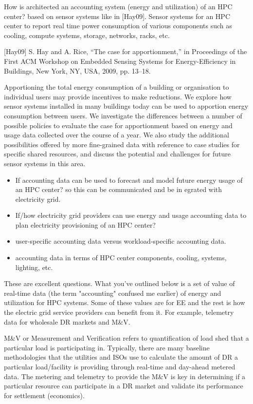 \documentclass{llncs}
\begin{document}
How is architected an accounting system (energy and utilization) of an HPC
center? based on sensor systems like in [Hay09]. Sensor systems for an HPC
center to report real time power consumption of various components such as
cooling, compute systems, storage, networks, racks, etc.

[Hay09] S. Hay and A. Rice, ``The case for apportionment,'' in Proceedings
of the First ACM Workshop on Embedded Sensing Systems for Energy-Efficiency
in Buildings, New York, NY, USA, 2009, pp. 13--18.

Apportioning the total energy consumption of a building or organisation to
individual users may provide incentives to make reductions. We explore how
sensor systems installed in many buildings today can be used to apportion
energy consumption between users. We investigate the differences between a
number of possible policies to evaluate the case for apportionment based on
energy and usage data collected over the course of a year. We also study the
additional possibilities offered by more fine-grained data with reference to
case studies for specific shared resources, and discuss the potential and
challenges for future sensor systems in this area.

\begin{itemize}
\item If accounting data can be used to forecast and model future energy usage of an HPC center? so this can be communicated and be in
egrated with electricity grid.
\item If/how electricity grid providers can use energy and usage accounting data to plan electricity provisioning of an HPC center?
\item user-specific accounting data versus workload-specific accounting data.
\item accounting data in terms of HPC center components, cooling, systems, lighting, etc.
\end{itemize}
These are excellent questions. What you've outlined below is a set of value
of real-time data (the term "accounting" confused me earlier) of energy and
utilization for HPC systems. Some of these values are for EE and the rest is
how the electric grid service providers can benefit from it. For example,
telemetry data for wholesale DR markets and M{\&}V.

M{\&}V or Measurement and Verification refers to quantification of load shed
that a particular load is participating in. Typically, there are many
baseline methodologies that the utilities and ISOs use to calculate the
amount of DR a particular load/facility is providing through real-time and
day-ahead metered data. The metering and telemetry to provide the M{\&}V is
key in determining if a particular resource can participate in a DR market
and validate its performance for settlement (economics).
\end{document}
